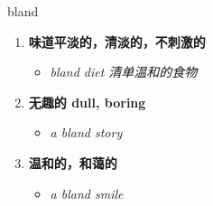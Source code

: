 
\begin{frame}
{\huge bland}
\begin{center}
\begin{enumerate}\Large
  \item \textbf{味道平淡的，清淡的，不刺激的}
  \begin{itemize}
    \item \em{\Large{bland diet 清单温和的食物}}
  \end{itemize}
  \item \textbf{无趣的 dull, boring}
  \begin{itemize}
    \item \em{\Large{a bland story}}
  \end{itemize}
  \item \textbf{温和的，和蔼的}
  \begin{itemize}
    \item \em{\Large{a bland smile}}
  \end{itemize}
\end{enumerate}
\end{center}
\end{frame}
